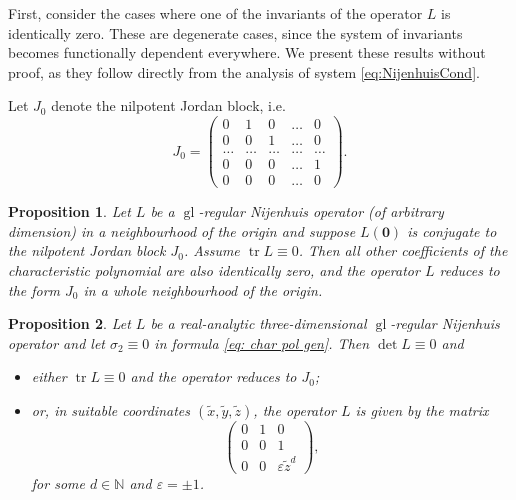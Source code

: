 \documentclass[10pt,a4paper]{amsart}
\newtheorem{Proposition}{Proposition}
\begin{document}
First, consider the cases where one of the invariants of the operator $L$ is identically zero. These are degenerate cases, since the system of invariants becomes functionally dependent everywhere. We present these results without proof, as they follow directly from the analysis of system \eqref{eq:NijenhuisCond}.

Let $J_0$ denote the nilpotent Jordan block, i.e.
\[
J_0 = \begin{pmatrix}
    0 & 1 & 0 & \ldots & 0 \\
    0 & 0 & 1 & \ldots & 0 \\
    \ldots & \ldots & \ldots & \ldots & \ldots \\
    0 & 0 & 0 & \ldots & 1 \\
    0 & 0 & 0 & \ldots & 0
\end{pmatrix}.
\]

\begin{Proposition} \label{st: tr L = 0}
    Let $L$ be a $\operatorname{gl}$-regular Nijenhuis operator (of arbitrary dimension) in a neighbourhood of the origin and suppose $L(\mathbf{0})$ is conjugate to the nilpotent Jordan block $J_0$. Assume $\operatorname{tr} L \equiv 0$. Then all other coefficients of the characteristic polynomial are also identically zero, and the operator $L$ reduces to the form $J_0$ in a whole neighbourhood of the origin.
\end{Proposition}

\begin{Proposition}
    Let $L$ be a real-analytic three-dimensional $\operatorname{gl}$-regular Nijenhuis operator and let $\sigma_2 \equiv 0$ in formula \eqref{eq: char pol gen}. Then $\det L \equiv 0$ and
    \begin{itemize}
        \item either $\operatorname{tr}L \equiv 0$ and the operator reduces to $J_0$;
        \item or, in suitable coordinates $(\tilde{x}, \tilde{y}, \tilde{z})$, the operator $L$ is given by the matrix
        \[
            \begin{pmatrix}
                0 & 1 & 0 \\
                0 & 0 & 1 \\
                0 & 0 & \varepsilon \tilde{z}^d
            \end{pmatrix},
        \]
        for some $d \in \mathbb{N}$ and $\varepsilon = \pm 1$.
    \end{itemize}
\end{Proposition}
\end{document}
